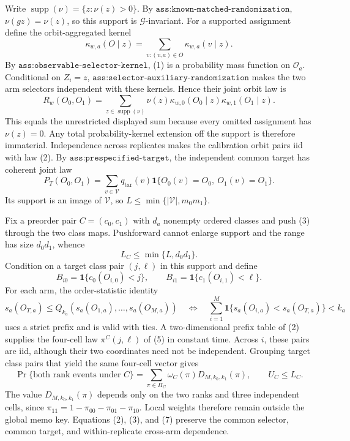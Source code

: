 Write \(\operatorname{supp}(\nu)=\{z:\nu(z)>0\}\). By \(\texttt{ass:known-matched-randomization}\), \(\nu(gz)=\nu(z)\), so this support is \(\mathcal G\)-invariant. For a supported assignment define the orbit-aggregated kernel
\[
\kappa_{w,a}(O\mid z)=\sum_{v:(v,a)\in O}\kappa_{w,a}(v\mid z).
\tag{1}
\]
By \(\texttt{ass:observable-selector-kernel}\), (1) is a probability mass function on \(\mathcal O_a\). Conditional on \(Z_i=z\), \(\texttt{ass:selector-auxiliary-randomization}\) makes the two arm selectors independent with these kernels. Hence their joint orbit law is
\[
R_w(O_0,O_1)=\sum_{z\in\operatorname{supp}(\nu)}\nu(z)
\kappa_{w,0}(O_0\mid z)\kappa_{w,1}(O_1\mid z).
\tag{2}
\]
This equals the unrestricted displayed sum because every omitted assignment has \(\nu(z)=0\). Any total probability-kernel extension off the support is therefore immaterial. Independence across replicates makes the calibration orbit pairs iid with law (2). By \(\texttt{ass:prespecified-target}\), the independent common target has coherent joint law
\[
P_T(O_0,O_1)=\sum_{v\in\mathcal V}q_{\mathrm{tar}}(v)
\mathbf 1\{O_0(v)=O_0,\ O_1(v)=O_1\}.
\tag{3}
\]
Its support is an image of \(\mathcal V\), so \(L\le\min\{|\mathcal V|,m_0m_1\}\).

Fix a preorder pair \(C=(c_0,c_1)\) with \(d_a\) nonempty ordered classes and push (3) through the two class maps. Pushforward cannot enlarge support and the range has size \(d_0d_1\), whence
\[
L_C\le\min\{L,d_0d_1\}.
\tag{4}
\]
Condition on a target class pair \((j,\ell)\) in this support and define
\[
B_{i0}=\mathbf 1\{c_0(O_{i,0})<j\},\qquad
B_{i1}=\mathbf 1\{c_1(O_{i,1})<\ell\}.
\tag{5}
\]
For each arm, the order-statistic identity
\[
s_a(O_{T,a})\le Q_{k_a}(s_a(O_{1,a}),\ldots,s_a(O_{M,a}))
\quad\Longleftrightarrow\quad
\sum_{i=1}^M\mathbf 1\{s_a(O_{i,a})<s_a(O_{T,a})\}<k_a
\tag{6}
\]
uses a strict prefix and is valid with ties. A two-dimensional prefix table of (2) supplies the four-cell law \(\pi^C(j,\ell)\) of (5) in constant time. Across \(i\), these pairs are iid, although their two coordinates need not be independent. Grouping target class pairs that yield the same four-cell vector gives
\[
\Pr\{\text{both rank events under }C\}
=\sum_{\pi\in\Pi_C}\omega_C(\pi)D_{M,k_0,k_1}(\pi),\qquad U_C\le L_C.
\tag{7}
\]
The value \(D_{M,k_0,k_1}(\pi)\) depends only on the two ranks and three independent cells, since \(\pi_{11}=1-\pi_{00}-\pi_{01}-\pi_{10}\). Local weights therefore remain outside the global memo key. Equations (2), (3), and (7) preserve the common selector, common target, and within-replicate cross-arm dependence.

